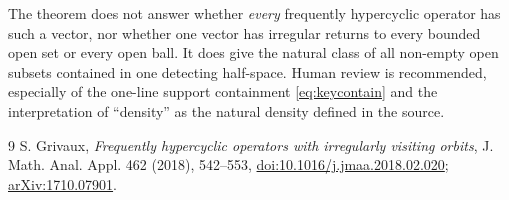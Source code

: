 \documentclass[10pt]{article}
\begin{document}
The theorem does not answer whether \emph{every} frequently hypercyclic
operator has such a vector, nor whether one vector has irregular returns to
every bounded open set or every open ball.  It does give the natural class of
all non-empty open subsets contained in one detecting half-space.  Human
review is recommended, especially of the one-line support containment
\eqref{eq:keycontain} and the interpretation of ``density'' as the natural
density defined in the source.

\begin{thebibliography}{9}
S. Grivaux,
\emph{Frequently hypercyclic operators with irregularly visiting orbits},
J. Math. Anal. Appl. 462 (2018), 542--553,
\href{https://doi.org/10.1016/j.jmaa.2018.02.020}{doi:10.1016/j.jmaa.2018.02.020};
\href{https://arxiv.org/abs/1710.07901}{arXiv:1710.07901}.
\end{thebibliography}
\end{document}
